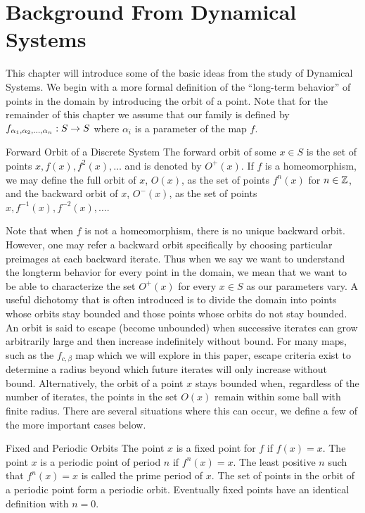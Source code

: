 \chapter{Background From Dynamical Systems}

This chapter will introduce some of the basic ideas from the study of Dynamical Systems. We begin with a more formal definition of the ``long-term behavior'' of points in the domain by introducing the orbit of a point. Note that for the remainder of this chapter we assume that our family is defined by $f_{\alpha_1, \alpha_2, \ldots, \alpha_n}: S \rightarrow S$ where $\alpha_i$ is a parameter of the map $f$.

\begin{mydef}{Forward Orbit of a Discrete System\cite{Dev2}}
	The forward orbit of some $x \in S$ is the set of points $x, f (x), f^2 (x),\ldots$ and is denoted by $O^+ (x)$. If $f$ is a homeomorphism, we may define the full orbit of $x$, $O (x)$, as the set of points $f^n (x)$ for $n \in \mathbb{Z}$, and the backward orbit of $x$, $O^- (x)$, as the set of points $x, f^{-1} (x), f^{-2} (x),\ldots$.
\end{mydef}
Note that when $f$ is not a homeomorphism, there is no unique backward orbit. However, one may refer a backward orbit specifically by choosing particular preimages at each backward iterate. Thus when we say we want to understand the longterm behavior for every point in the domain, we mean that we want to be able to characterize the set $O^+ (x)$ for every $x \in S$ as our parameters vary. A useful dichotomy that is often introduced is to divide the domain into points whose orbits stay bounded and those points whose orbits do not stay bounded. An orbit is said to escape (become unbounded) when successive iterates can grow arbitrarily large and then increase indefinitely without bound. For many maps, such as the $f_{c, \beta}$ map which we will explore in this paper, escape criteria exist to determine a radius beyond which future iterates will only increase without bound\cite{sym}. Alternatively, the orbit of a point $x$ stays bounded when, regardless of the number of iterates, the points in the set $O (x)$ remain within some ball with finite radius. There are several situations where this can occur, we define a few of the more important cases below.

\begin{mydef}{Fixed and Periodic Orbits\cite{Dev2}}
	The point $x$ is a fixed point for $f$ if $f (x) = x$. The point $x$ is a periodic point of period $n$ if $f^n (x) = x$. The least positive $n$ such that $f^n (x) = x$ is called the prime period of $x$. The set of points in the orbit of a periodic point form a periodic orbit. Eventually fixed points have an identical definition with $n=0$.
\end{mydef}

